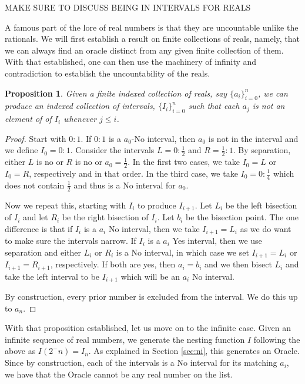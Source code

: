 \documentclass[12pt]{article}
\newtheorem{proposition}{Proposition}
\theoremstyle{remark}
\begin{document}
MAKE SURE TO DISCUSS BEING IN INTERVALS FOR REALS

A famous part of the lore of real numbers is that they are uncountable unlike the rationals. We will first establish a result on finite collections of reals, namely, that we can always find an oracle distinct from any given finite collection of them. With that established, one can then use the machinery of infinity and contradiction to establish the uncountability of the reals. 

\begin{proposition}
Given a finite indexed collection of reals, say $\{a_i\}_{i=0}^n$, we can produce an indexed collection of intervals, $\{I_i\}_{i=0}^n$ such that each $a_j$ is not an element of of $I_i$ whenever $j \leq i$.
\end{proposition}

\begin{proof}
Start with $0:1$. If $0:1$ is a $a_0$-No interval, then $a_0$ is not in the interval and we define $I_0 = 0:1$.  Consider the intervals $L= 0:\tfrac{1}{2}$ and $R = \tfrac{1}{2}:1$. By separation, either $L$ is no or $R$ is no or $a_0 = \tfrac{1}{2}$. In the first two cases, we take $I_0=L$ or $I_0=R$, respectively and in that order. In the third case, we take $I_0 = 0:\tfrac{1}{4}$ which does not contain $\tfrac{1}{2}$ and thus is a No interval for $a_0$.

Now we repeat this, starting with $I_i$ to produce $I_{i+1}$. Let $L_i$ be the left bisection of $I_i$ and let $R_i$ be the right bisection of $I_i$. Let $b_i$ be the bisection point. The one difference is that if $I_i$ is a $a_i$ No interval, then we take $I_{i+1} = L_i$ as we do want to make sure the intervals narrow. If $I_i$ is a $a_i$ Yes interval, then we use separation and either $L_i$ or $R_i$ is a No interval, in which case we set $I_{i+1} = L_i $ or $I_{i+1} = R_{i+1}$, respectively. If both are yes, then $a_i = b_i$ and we then bisect $L_i$ and take the left interval to be $I_{i+1}$ which will be an $a_i$ No interval. 

By construction, every prior number is excluded from the interval. We do this up to $a_n$.
\end{proof} 

With that proposition established, let us move on to the infinite case. Given an infinite sequence of real numbers, we generate the nesting function $I$ following the above as $I(2^-n) = I_n$. As explained in Section \ref{sec:ni}, this generates an Oracle. Since by construction, each of the intervals is a No interval for its matching $a_i$, we have that the Oracle cannot be any real number on the list. 
\end{document}
